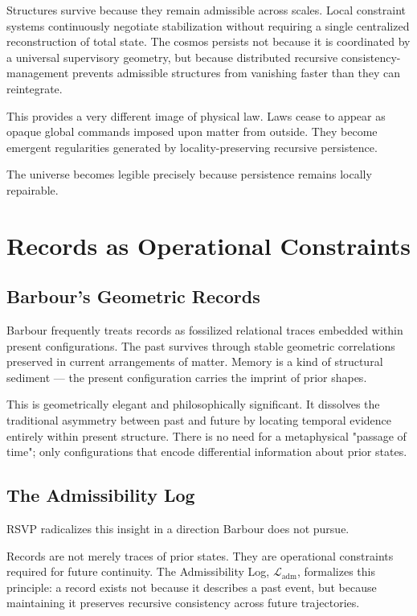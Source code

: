 \documentclass[12pt, a4paper]{article}
\newcommand{\admlog}{\mathcal{L}_{\mathrm{adm}}}
\begin{document}
Structures survive because they remain admissible across scales. Local
constraint systems continuously negotiate stabilization without requiring a
single centralized reconstruction of total state. The cosmos persists not
because it is coordinated by a universal supervisory geometry, but because
distributed recursive consistency-management prevents admissible structures
from vanishing faster than they can reintegrate.

This provides a very different image of physical law. Laws cease to appear
as opaque global commands imposed upon matter from outside. They become
emergent regularities generated by locality-preserving recursive persistence.

The universe becomes legible precisely because persistence remains locally
repairable.

\section{Records as Operational Constraints}

\subsection{Barbour's Geometric Records}

Barbour frequently treats records as fossilized relational traces embedded
within present configurations. The past survives through stable geometric
correlations preserved in current arrangements of matter. Memory is a kind
of structural sediment — the present configuration carries the imprint of
prior shapes.

This is geometrically elegant and philosophically significant. It dissolves
the traditional asymmetry between past and future by locating temporal
evidence entirely within present structure. There is no need for a
metaphysical "passage of time"; only configurations that encode differential
information about prior states.

\subsection{The Admissibility Log}

RSVP radicalizes this insight in a direction Barbour does not pursue.

Records are not merely traces of prior states. They are operational
constraints required for future continuity. The Admissibility Log,
\(\admlog\), formalizes this principle: a record exists not because it
describes a past event, but because maintaining it preserves recursive
consistency across future trajectories.
\end{document}

